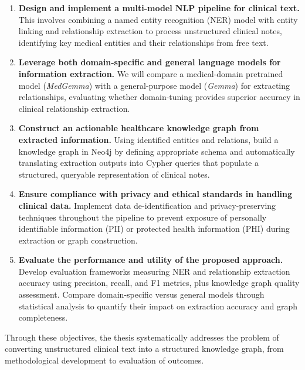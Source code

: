 \begin{enumerate}
  \item \textbf{Design and implement a multi-model NLP pipeline for clinical text.} This involves combining a named entity recognition (NER) model with entity linking and relationship extraction to process unstructured clinical notes, identifying key medical entities and their relationships from free text.

  \item \textbf{Leverage both domain-specific and general language models for information extraction.} We will compare a medical-domain pretrained model (\emph{MedGemma}) with a general-purpose model (\emph{Gemma}) for extracting relationships, evaluating whether domain-tuning provides superior accuracy in clinical relationship extraction.

  \item \textbf{Construct an actionable healthcare knowledge graph from extracted information.} Using identified entities and relations, build a knowledge graph in Neo4j by defining appropriate schema and automatically translating extraction outputs into Cypher queries that populate a structured, queryable representation of clinical notes.

  \item \textbf{Ensure compliance with privacy and ethical standards in handling clinical data.} Implement data de-identification and privacy-preserving techniques throughout the pipeline to prevent exposure of personally identifiable information (PII) or protected health information (PHI) during extraction or graph construction.

  \item \textbf{Evaluate the performance and utility of the proposed approach.} Develop evaluation frameworks measuring NER and relationship extraction accuracy using precision, recall, and F1 metrics, plus knowledge graph quality assessment. Compare domain-specific versus general models through statistical analysis to quantify their impact on extraction accuracy and graph completeness.
\end{enumerate}

Through these objectives, the thesis systematically addresses the problem of converting unstructured clinical text into a structured knowledge graph, from methodological development to evaluation of outcomes.


